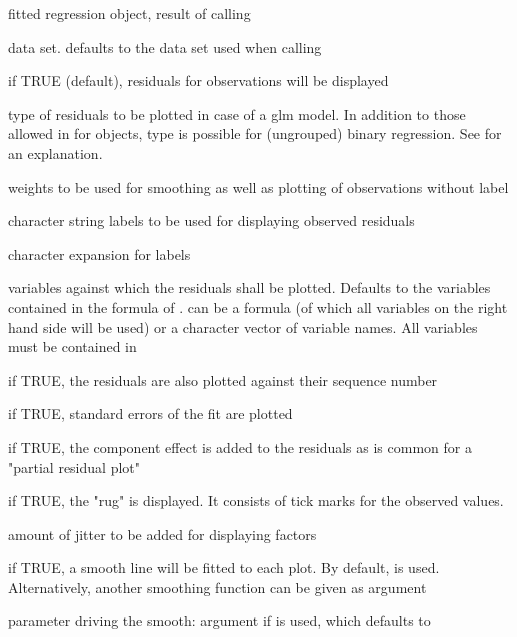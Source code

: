 \documentclass{article}
\begin{document}
\begin{Arguments}
\begin{ldescription}
\item[\code{x}] fitted regression object, result of calling 
\item[\code{data}] data set. defaults to the data set used when calling 
\item[\code{partial.resid}] if TRUE (default),
residuals for observations will be displayed
\item[\code{glm.restype}] type of residuals to be plotted in case of a glm
model. In addition to those allowed in  for
 objects, type  is possible for
(ungrouped) binary regression. See  for
an explanation.
\item[\code{weights}] weights to be used for smoothing as well as
plotting of observations without label
\item[\code{lab}] character string labels to be used for displaying observed
residuals
\item[\code{cex.lab}] character expansion for labels
\item[\code{vars}] variables against which the residuals shall be plotted.
Defaults to the variables contained in the formula of .
 can be a formula (of which all variables on the right
hand side will be used) or a character vector of variable names.
All variables must be contained in 
\item[\code{sequence}] if TRUE, the residuals are also plotted against their
sequence number
\item[\code{se}] if TRUE, standard errors of the fit are plotted
\item[\code{addcomp}] if TRUE, the component effect is added to the residuals
as is common for a "partial residual plot"
\item[\code{rug}] if TRUE, the "rug" is displayed. It consists of tick marks
for the observed values.
\item[\code{jitter}] amount of jitter to be added for displaying factors
\item[\code{smooth}] if TRUE, a smooth line will be fitted to each plot.
By default,  is used. Alternatively, another smoothing
function can be given as argument 
\item[\code{smooth.par}] parameter driving the smooth: argument 
if  is used, which defaults to

\end{ldescription}
\end{Arguments}
\end{document}
